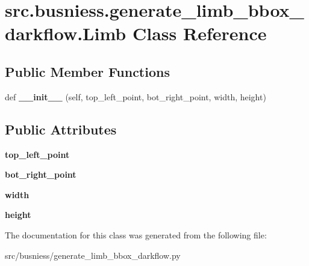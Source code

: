 \hypertarget{classsrc_1_1busniess_1_1generate__limb__bbox__darkflow_1_1_limb}{}\section{src.\+busniess.\+generate\+\_\+limb\+\_\+bbox\+\_\+darkflow.\+Limb Class Reference}
\label{classsrc_1_1busniess_1_1generate__limb__bbox__darkflow_1_1_limb}
\subsection*{Public Member Functions}
\begin{DoxyCompactItemize}
\item 
\mbox{\label{classsrc_1_1busniess_1_1generate__limb__bbox__darkflow_1_1_limb_af591e18383691855fe3ec7e5b81aab1b}} 
def {\bfseries \+\_\+\+\_\+init\+\_\+\+\_\+} (self, top\+\_\+left\+\_\+point, bot\+\_\+right\+\_\+point, width, height)
\end{DoxyCompactItemize}
\subsection*{Public Attributes}
\begin{DoxyCompactItemize}
\item 
\mbox{\label{classsrc_1_1busniess_1_1generate__limb__bbox__darkflow_1_1_limb_add88827d3910eeb347c8807b49425361}} 
{\bfseries top\+\_\+left\+\_\+point}
\item 
\mbox{\label{classsrc_1_1busniess_1_1generate__limb__bbox__darkflow_1_1_limb_a2985217bd23c2552af76c791f9ca19e8}} 
{\bfseries bot\+\_\+right\+\_\+point}
\item 
\mbox{\label{classsrc_1_1busniess_1_1generate__limb__bbox__darkflow_1_1_limb_a40afac25b7ba8abfe92eab9812e43dfd}} 
{\bfseries width}
\item 
\mbox{\label{classsrc_1_1busniess_1_1generate__limb__bbox__darkflow_1_1_limb_ab6f1988941838b10243c97b8c806bda2}} 
{\bfseries height}
\end{DoxyCompactItemize}


The documentation for this class was generated from the following file\+:\begin{DoxyCompactItemize}
\item 
src/busniess/generate\+\_\+limb\+\_\+bbox\+\_\+darkflow.\+py\end{DoxyCompactItemize}
